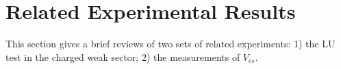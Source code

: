







% 



\section{Related Experimental Results}

This section gives a brief reviews of two sets of related experiments: 1) the LU test in the charged weak sector; 2) the measurements of $V_{cs}$.

